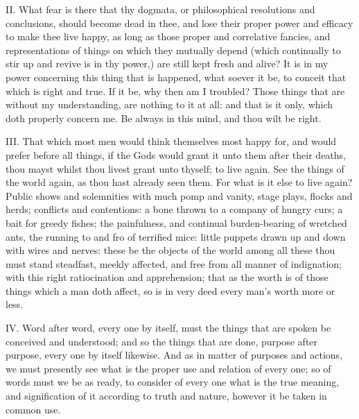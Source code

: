 II. What fear is there that thy dogmata, or philosophical resolutions
and conclusions, should become dead in thee, and lose their proper power
and efficacy to make thee live happy, as long as those proper and
correlative fancies, and representations of things on which they mutually
depend (which continually to stir up and revive is in thy power,) are
still kept fresh and alive? It is in my power concerning this thing that
is happened, what soever it be, to conceit that which is right and true.
If it be, why then am I troubled? Those things that are without my
understanding, are nothing to it at all: and that is it only, which doth
properly concern me. Be always in this mind, and thou wilt be right.

III. That which most men would think themselves most happy for, and
would prefer before all things, if the Gods would grant it unto them after
their deaths, thou mayst whilst thou livest grant unto thyself; to live
again. See the things of the world again, as thou hast already seen them.
For what is it else to live again? Public shows and solemnities with much
pomp and vanity, stage plays, flocks and herds; conflicts and contentions:
a bone thrown to a company of hungry curs; a bait for greedy fishes; the
painfulness, and continual burden-bearing of wretched ants, the running to
and fro of terrified mice: little puppets drawn up and down with wires and
nerves: these be the objects of the world among all these thou must stand
steadfast, meekly affected, and free from all manner of indignation; with
this right ratiocination and apprehension; that as the worth is of those
things which a man doth affect, so is in very deed every man's worth more
or less.

IV. Word after word, every one by itself, must the things that are
spoken be conceived and understood; and so the things that are done,
purpose after purpose, every one by itself likewise. And as in matter of
purposes and actions, we must presently see what is the proper use and
relation of every one; so of words must we be as ready, to consider of
every one what is the true meaning, and signification of it according to
truth and nature, however it be taken in common use.

